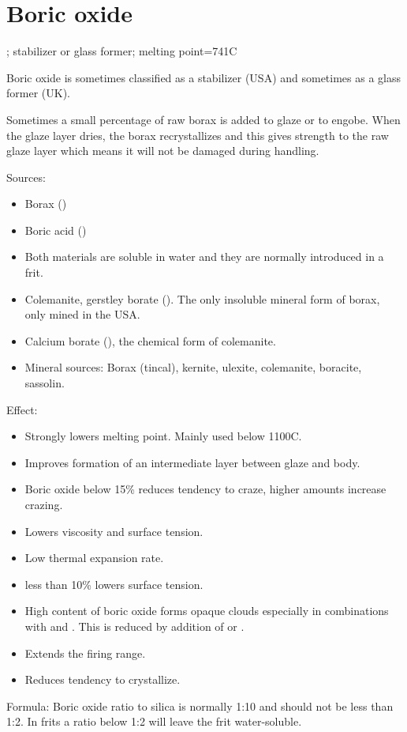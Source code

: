 \section{Boric oxide}
; stabilizer or glass former; melting point=741\degree C

Boric oxide is sometimes classified as a stabilizer (USA) and sometimes as a 
glass former (UK).

Sometimes a small percentage of raw borax is added to glaze or to engobe. When 
the glaze layer dries, the borax recrystallizes and this gives strength to the 
raw glaze layer which means it will not be damaged during handling.

Sources:
\begin{itemize}
\item Borax ()
\item Boric acid ()
\item Both materials are soluble in water and they are normally introduced in a 
frit.
\item Colemanite, gerstley borate (). The only insoluble 
mineral form of borax, only mined in the USA.
\item Calcium borate (), the chemical form of colemanite.
\item Mineral sources: Borax (tincal), kernite, ulexite, colemanite, boracite, 
sassolin.
\end{itemize}
Effect:
\begin{itemize}
  \item Strongly lowers melting point. Mainly used below 1100\degree C.
  \item Improves formation of an intermediate layer between glaze and body.
  \item Boric oxide below 15\% reduces tendency to craze, higher amounts 
  increase crazing.
  \item Lowers viscosity and surface tension.
  \item Low thermal expansion rate.
  \item {} less than 10\% lowers surface tension.
  \item High content of boric oxide forms opaque clouds especially in 
  combinations with  and . This is reduced by addition of 
   or .
  \item Extends the firing range.
  \item Reduces tendency to crystallize.
\end{itemize}
Formula: Boric oxide ratio to silica is normally 1:10 and should not be less 
than 1:2. In frits a ratio below 1:2 will leave the frit water-soluble.

